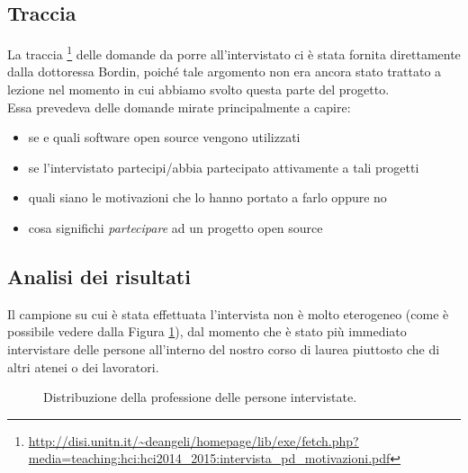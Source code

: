 \documentclass[12pt]{article} %
\begin{document}
\subsection{Traccia}
La traccia \footnote{\url{http://disi.unitn.it/~deangeli/homepage/lib/exe/fetch.php?media=teaching:hci:hci2014_2015:intervista_pd_motivazioni.pdf}} delle domande da porre all'intervistato ci è stata fornita direttamente dalla dottoressa Bordin, poiché tale argomento non era ancora stato trattato a lezione nel momento in cui abbiamo svolto questa parte del progetto.\\
Essa prevedeva delle domande mirate principalmente a capire:
\begin{itemize}
\item se e quali software open source vengono utilizzati
\item se l'intervistato partecipi/abbia partecipato attivamente a tali progetti
\item quali siano le motivazioni che lo hanno portato a farlo oppure no
\item cosa significhi \emph{partecipare} ad un progetto open source
\end{itemize}
\subsection{Analisi dei risultati}
Il campione su cui è stata effettuata l'intervista non è molto eterogeneo (come è possibile vedere dalla Figura \ref{fig:distribuzione}), dal momento che è stato più immediato intervistare delle persone all'interno del nostro corso di laurea piuttosto che di altri atenei o dei lavoratori.

\begin{figure}[H] 
\caption{Distribuzione della professione delle persone intervistate.}
\label{fig:distribuzione}
\end{figure}
\end{document}

